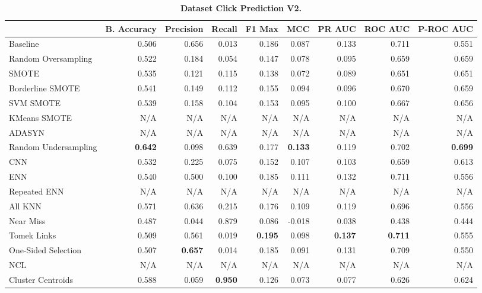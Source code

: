 \begin{table}[H]
    \centering
    \setlength\tabcolsep{2pt}
    \begin{tabularx}{\textwidth}{lRRRRRRRR}
        & B. Accuracy & Precision & Recall & F1 Max & MCC & PR AUC & ROC AUC & P-ROC AUC \\
        \midrule
        Baseline & 0.506 & 0.656 & 0.013 & 0.186 & 0.087 & 0.133 & 0.711 & 0.551 \\
        Random Oversampling & 0.522 & 0.184 & 0.054 & 0.147 & 0.078 & 0.095 & 0.659 & 0.659 \\
        SMOTE & 0.535 & 0.121 & 0.115 & 0.138 & 0.072 & 0.089 & 0.651 & 0.651 \\
        Borderline SMOTE & 0.541 & 0.149 & 0.112 & 0.155 & 0.094 & 0.096 & 0.670 & 0.659 \\
        SVM SMOTE & 0.539 & 0.158 & 0.104 & 0.153 & 0.095 & 0.100 & 0.667 & 0.656 \\
        KMeans SMOTE & N/A & N/A & N/A & N/A & N/A & N/A & N/A & N/A \\
        ADASYN & N/A & N/A & N/A & N/A & N/A & N/A & N/A & N/A \\
        Random Undersampling & \textbf{0.642} & 0.098 & 0.639 & 0.177 & \textbf{0.133} & 0.119 & 0.702 & \textbf{0.699} \\
        CNN & 0.532 & 0.225 & 0.075 & 0.152 & 0.107 & 0.103 & 0.659 & 0.613 \\
        ENN & 0.540 & 0.500 & 0.100 & 0.185 & 0.111 & 0.132 & 0.711 & 0.556 \\
        Repeated ENN & N/A & N/A & N/A & N/A & N/A & N/A & N/A & N/A \\
        All KNN & 0.571 & 0.636 & 0.215 & 0.176 & 0.109 & 0.119 & 0.696 & 0.556 \\
        Near Miss & 0.487 & 0.044 & 0.879 & 0.086 & -0.018 & 0.038 & 0.438 & 0.444 \\
        Tomek Links & 0.509 & 0.561 & 0.019 & \textbf{0.195} & 0.098 & \textbf{0.137} & \textbf{0.711} & 0.555 \\
        One-Sided Selection & 0.507 & \textbf{0.657} & 0.014 & 0.185 & 0.091 & 0.131 & 0.709 & 0.550 \\
        NCL & N/A & N/A & N/A & N/A & N/A & N/A & N/A & N/A \\
        Cluster Centroids & 0.588 & 0.059 & \textbf{0.950} & 0.126 & 0.073 & 0.077 & 0.626 & 0.624 \\
    \end{tabularx}
    \vspace{1mm}
    \caption{\textbf{Dataset Click Prediction V2.}}
\end{table}
